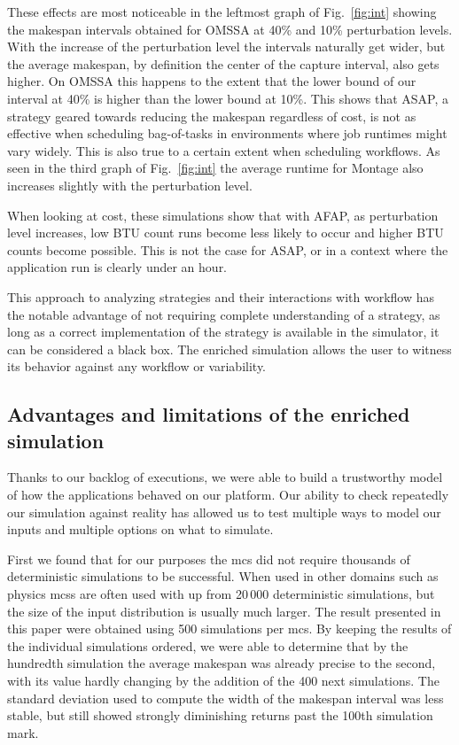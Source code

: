 \documentclass[10pt,conference,compsocconf]{IEEEtran}
\begin{document}
These effects are most noticeable in the leftmost graph of Fig.~\ref{fig:int}
showing the makespan intervals obtained for OMSSA at 40\% and 10\% perturbation
levels. With the increase of the perturbation level the intervals naturally get 
wider, but the average makespan, by definition the center of the capture 
interval, also gets higher. On OMSSA this happens to the extent that the lower 
bound of our interval at 40\% is higher than the lower bound at 10\%.
This shows that ASAP, a strategy geared towards reducing the makespan regardless
of cost, is not as effective when scheduling bag-of-tasks in environments where
job runtimes might vary widely.  This is also true to a certain extent when
scheduling workflows. As seen in the third graph of Fig.~\ref{fig:int} the
average runtime for Montage also increases slightly with the perturbation level.

When looking at cost, these simulations show that with AFAP, as
perturbation level increases, low BTU count runs become less likely to occur and
higher BTU counts become possible. This is not the case for ASAP, or in a 
context where the application run is clearly under an hour.

This approach to analyzing strategies and their interactions with workflow has
the notable advantage of not requiring complete understanding of a strategy, as
long as a correct implementation of the strategy is available in the simulator,
it can be considered a black box. The enriched simulation allows the user to
witness its behavior against any workflow or variability.


\subsection{Advantages and limitations of the enriched simulation}\label{sec:lim}

Thanks to our backlog of executions, we were able to build a trustworthy model
of how the applications behaved on our platform. Our ability to check repeatedly
our simulation against reality has allowed us to test multiple ways to model 
our inputs and multiple options on what to simulate. 

First we found that  for our purposes the \ac{mcs} did  not require thousands of
deterministic simulations to  be successful. When used in other  domains such as
physics \acp{mcs} are often used with up from 20\,000 deterministic simulations,
but  the size  of the  input  distribution is  usually much  larger. The  result
presented  in this  paper were obtained using  500 simulations per \ac{mcs}.  By
keeping  the results  of the  individual simulations  ordered, we  were able  to
determine  that by  the hundredth  simulation the  average makespan  was already
precise to the second, with its value hardly changing by the addition of the 400
next  simulations. The  standard  deviation used  to compute  the  width of  the
makespan interval was less stable, but still showed strongly diminishing returns
past the 100th simulation mark.
\end{document}
